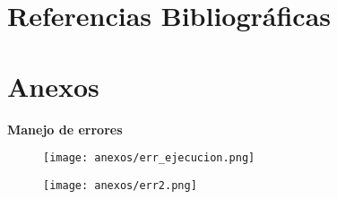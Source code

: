 \documentclass[12pt,letterpaper]{article}
\begin{document}
\section{Referencias Bibliográficas}
\printbibliography[heading=none]


\section{Anexos}

\textbf{Manejo de errores}

\begin{figure}[H]
    \centering
    \texttt{[image: anexos/err\_ejecucion.png]}
\end{figure}

\begin{figure}[H]
    \centering
    \texttt{[image: anexos/err2.png]}
\end{figure}
\end{document}

